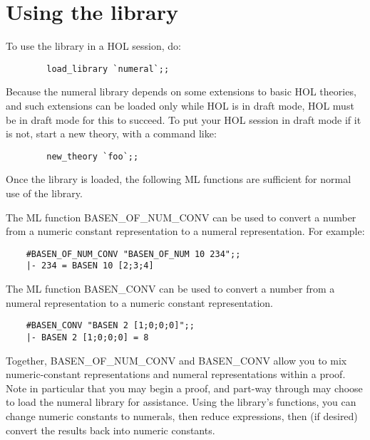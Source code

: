 \section{Using the library}

To use the library in a HOL session, do:

\begin{hol}\begin{verbatim}
        load_library `numeral`;;
\end{verbatim}\end{hol}

Because the numeral library depends on some extensions to basic HOL theories,
and such extensions can be loaded only while HOL is in draft mode, HOL must be
in draft mode for this to succeed.  To put your HOL session in draft mode if it
is not, start a new theory, with a command like:

\begin{hol}\begin{verbatim}
        new_theory `foo`;;
\end{verbatim}\end{hol}

Once the library is loaded, the following ML functions are sufficient for
normal use of the library.

The ML function {\ml BASEN\_OF\_NUM\_CONV} can be used to convert a number from
a numeric constant representation to a numeral representation.  For example:

\begin{hol}\begin{verbatim}
    #BASEN_OF_NUM_CONV "BASEN_OF_NUM 10 234";;
    |- 234 = BASEN 10 [2;3;4]
\end{verbatim}\end{hol}

The ML function {\ml BASEN\_CONV } can be used to convert a number from a
numeral representation to a numeric constant representation.

\begin{hol}\begin{verbatim}
    #BASEN_CONV "BASEN 2 [1;0;0;0]";;
    |- BASEN 2 [1;0;0;0] = 8
\end{verbatim}\end{hol}

Together, {\ml BASEN\_OF\_NUM\_CONV } and {\ml BASEN\_CONV } allow you to mix
numeric-constant representations and numeral representations within a proof.
Note in particular that you may begin a proof, and part-way through may choose
to load the numeral library for assistance.  Using the library's functions, you
can change numeric constants to numerals, then reduce expressions, then (if
desired) convert the results back into numeric constants.

